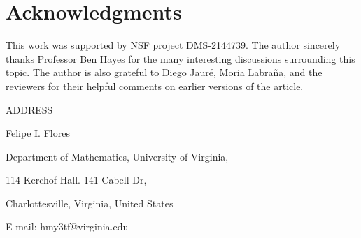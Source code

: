 \documentclass[11pt]{article}
\theoremstyle{definition}
\theoremstyle{remark}
\numberwithin{equation}{section}
\numberwithin{equation}{section}
\begin{document}
\section*{Acknowledgments}

This work was supported by NSF project DMS-2144739. The author sincerely thanks Professor Ben Hayes for the many interesting discussions surrounding this topic. The author is also grateful to Diego Jauré, Moria Labraña, and the reviewers for their helpful comments on earlier versions of the article.

\printbibliography


\bigskip
\bigskip
ADDRESS

\smallskip
Felipe I. Flores

Department of Mathematics, University of Virginia,

114 Kerchof Hall. 141 Cabell Dr,

Charlottesville, Virginia, United States

E-mail: hmy3tf@virginia.edu
\end{document}
